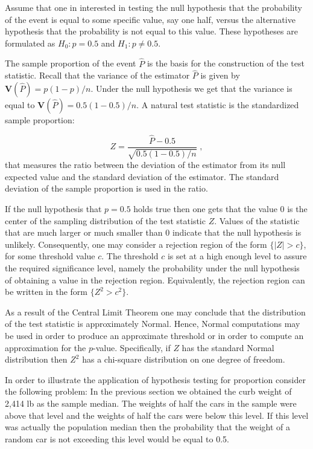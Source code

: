 \documentclass[
]{krantz}
\newcommand{\Var}{\mathbf{V}}
\theoremstyle{definition}
\theoremstyle{definition}
\theoremstyle{definition}
\theoremstyle{remark}
\begin{document}
Assume that one in interested in testing the null hypothesis that the
probability of the event is equal to some specific value, say one half,
versus the alternative hypothesis that the probability is not equal to
this value. These hypotheses are formulated as \(H_0:p = 0.5\) and
\(H_1:p\not = 0.5\).

The sample proportion of the event \(\hat P\) is the basis for the
construction of the test statistic. Recall that the variance of the
estimator \(\hat P\) is given by \(\Var(\hat P) = p(1-p)/n\). Under the null
hypothesis we get that the variance is equal to
\(\Var(\hat P) = 0.5(1-0.5)/n\). A natural test statistic is the
standardized sample proportion:

\[Z = \frac{\hat P - 0.5}{\sqrt{0.5 (1-0.5)/n}}\;,\] that measures the
ratio between the deviation of the estimator from its null expected
value and the standard deviation of the estimator. The standard
deviation of the sample proportion is used in the ratio.

If the null hypothesis that \(p=0.5\) holds true then one gets that the
value 0 is the center of the sampling distribution of the test statistic
\(Z\). Values of the statistic that are much larger or much smaller than 0
indicate that the null hypothesis is unlikely. Consequently, one may
consider a rejection region of the form \(\{|Z| > c\}\), for some
threshold value \(c\). The threshold \(c\) is set at a high enough level to
assure the required significance level, namely the probability under the
null hypothesis of obtaining a value in the rejection region.
Equivalently, the rejection region can be written in the form
\(\{Z^2 > c^2\}\).

As a result of the Central Limit Theorem one may conclude that the
distribution of the test statistic is approximately Normal. Hence,
Normal computations may be used in order to produce an approximate
threshold or in order to compute an approximation for the \(p\)-value.
Specifically, if \(Z\) has the standard Normal distribution then \(Z^2\) has
a chi-square distribution on one degree of freedom.

In order to illustrate the application of hypothesis testing for
proportion consider the following problem: In the previous section we
obtained the curb weight of 2,414 lb as the sample median. The weights
of half the cars in the sample were above that level and the weights of
half the cars were below this level. If this level was actually the
population median then the probability that the weight of a random car
is not exceeding this level would be equal to 0.5.
\end{document}
